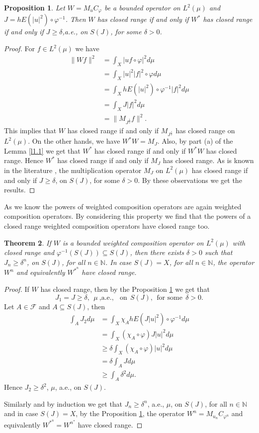 \documentclass{amsart}
\newtheorem{thm}{Theorem}[section]
\newtheorem{prop}[thm]{Proposition}
\theoremstyle{definition}\newtheorem{defn}[thm]{Definition}
\theoremstyle{remark}
\numberwithin{equation}{section}
\begin{document}
\begin{prop}\label{p1.2}
Let $W=M_uC_{\varphi}$ be a bounded operator on $L^2(\mu)$ and $J=hE(|u|^2)\circ\varphi^{-1}$. Then $W$ has closed range if and only if $W^*$ has closed range if and only if $J\geq \delta$,a.e., on $S(J)$, for some $\delta>0$.
\end{prop}
\begin{proof}
For $f\in L^2(\mu)$ we have 
\begin{align*}
\|Wf\|^2&=\int_X|uf\circ\varphi|^2d\mu\\
&=\int_X|u|^2|f|^2\circ\varphi d\mu\\
&=\int_XhE(|u|^2)\circ\varphi^{-1}|f|^2d\mu\\
&=\int_XJ|f|^2d\mu\\
&=\|M_{J^{\frac{1}{2}}}f\|^2.
\end{align*}
This implies that $W$ has closed range if and only if $M_{J^{\frac{1}{2}}}$ has closed range on $L^2(\mu)$. On the other hands, we have $W^*W=M_J$. Also, by part (a) of the Lemma \ref{l1.1} we get that $W^*$ has closed range if and only if $W^*W$ has closed range. Hence $W^*$ has closed range if and only if $M_J$ has closed range. As is known in the literature \cite{tak}, the multiplication operator $M_J$ on $L^2(\mu)$ has closed range if and only if $J\geq \delta$, on $S(J)$, for some $\delta>0$. By these observations we get the results.
\end{proof}
As we know the powers of weighted composition operators are again weighted composition operators. By considering this property we find that the powers of a closed range weighted composition operators have closed range too.
\begin{thm}
If $W$ is a bounded weighted composition operator on $L^2(\mu)$ with closed range and $\varphi^{-1}(S(J))\subseteq S(J)$, then there exists $\delta>0$ such that $J_n\geq \delta^n$, on $S(J)$, for all $n\in \mathbb{N}$. In case $S(J)=X$, for all $n\in \mathbb{N}$, the operator $W^n$ and equivalently $W^{*^n}$ have closed range.
\end{thm}
\begin{proof}
If $W$ has closed range, then by the Proposition \ref{p1.2} we get that 
$$J_1=J\geq \delta, \ \ \mu \  \text{,a.e.,}\ \ \ \ \text{on}\ \ S(J), \ \ \text{for some} \ \ \delta>0.$$
Let $A\in \mathcal{F}$ and $A\subseteq S(J)$, then 
\begin{align*}
\int_AJ_2d\mu&=\int_X \chi_AhE(J|u|^2)\circ\varphi^{-1}d\mu\\
&=\int_X (\chi_{A}\circ\varphi) J|u|^2d\mu\\
&\geq \delta\int_X(\chi_A\circ\varphi)|u|^2d\mu\\
&=\delta\int_AJd\mu\\
&\geq\int_A\delta^2d\mu.
\end{align*}
Hence $J_2\geq \delta^2$, $\mu$, a.e., on $S(J)$. 
  
Similarly and by induction we get that $J_n\geq \delta^n$, a.e., $\mu$, on $S(J)$, for all $n\in \mathbb{N}$ and in case $S(J)=X$, by the Proposition \ref{p1.2}, the operator $W^n=M_{u_n}C_{\varphi^n}$ and equivalently $W^{*^n}=W^{n^*}$ have closed range.
\end{proof}
\end{document}
